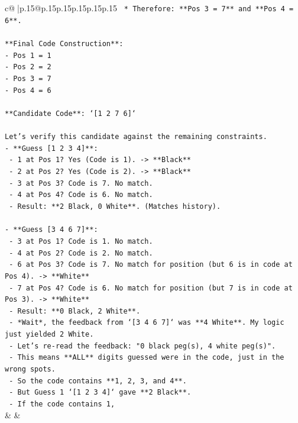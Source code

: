 \documentclass{article}
\begin{document}
{\begin{supertabular}{c@{$\;$}|p{.15\linewidth}@{}p{.15\linewidth}p{.15\linewidth}p{.15\linewidth}p{.15\linewidth}p{.15\linewidth}}
{{{\texttt{    *   Therefore: **Pos 3 = 7** and **Pos 4 = 6**.} \\
\\ 
\texttt{**Final Code Construction**:} \\
\texttt{{-} Pos 1 = 1} \\
\texttt{{-} Pos 2 = 2} \\
\texttt{{-} Pos 3 = 7} \\
\texttt{{-} Pos 4 = 6} \\
\\ 
\texttt{**Candidate Code**: `{[}1 2 7 6{]}`} \\
\\ 
\texttt{Let's verify this candidate against the remaining constraints.} \\
\texttt{{-} **Guess {[}1 2 3 4{]}**:} \\
\texttt{  {-} 1 at Pos 1? Yes (Code is 1). {-}> **Black**} \\
\texttt{  {-} 2 at Pos 2? Yes (Code is 2). {-}> **Black**} \\
\texttt{  {-} 3 at Pos 3? Code is 7. No match.} \\
\texttt{  {-} 4 at Pos 4? Code is 6. No match.} \\
\texttt{  {-} Result: **2 Black, 0 White**. (Matches history).} \\
\\ 
\texttt{{-} **Guess {[}3 4 6 7{]}**:} \\
\texttt{  {-} 3 at Pos 1? Code is 1. No match.} \\
\texttt{  {-} 4 at Pos 2? Code is 2. No match.} \\
\texttt{  {-} 6 at Pos 3? Code is 7. No match for position (but 6 is in code at Pos 4). {-}> **White**} \\
\texttt{  {-} 7 at Pos 4? Code is 6. No match for position (but 7 is in code at Pos 3). {-}> **White**} \\
\texttt{  {-} Result: **0 Black, 2 White**.} \\
\texttt{  {-} *Wait*, the feedback from `{[}3 4 6 7{]}` was **4 White**. My logic just yielded 2 White.} \\
\texttt{  {-} Let's re{-}read the feedback: "0 black peg(s), 4 white peg(s)".} \\
\texttt{  {-} This means **ALL** digits guessed were in the code, just in the wrong spots.} \\
\texttt{  {-} So the code contains **1, 2, 3, and 4**.} \\
\texttt{  {-} But Guess 1 `{[}1 2 3 4{]}` gave **2 Black**.} \\
\texttt{  {-} If the code contains 1,} \\
            }
        }
    }
    & & \\ \\


\end{supertabular}}
\end{document}
